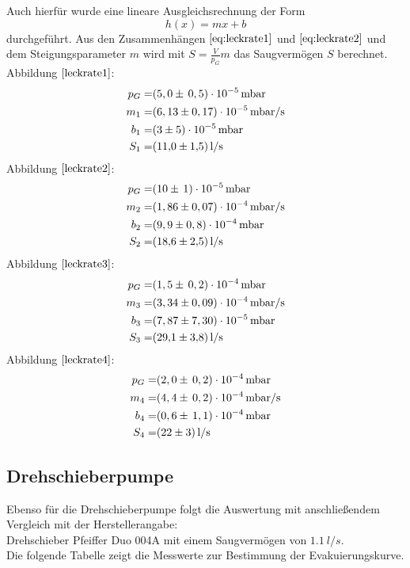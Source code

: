Auch hierfür wurde eine lineare Ausgleichsrechnung der Form
\begin{equation}
	h(x)=mx+b
\end{equation}
durchgeführt.
Aus den Zusammenhängen $\ref{eq:leckrate1}$ und $\ref{eq:leckrate2}$ und dem Steigungsparameter $m$ wird mit $S=\frac{V}{p_G}m$
das Saugvermögen $S$ berechnet.\\

Abbildung $\ref{leckrate1}$:
	\begin{align*}
		p_G=& (5,0 \pm \, 0,5)\cdot 10^{-5} \, \si{mbar}\\
		m_1=& (6,13 \pm 0,17)\cdot 10^{-5} \, \si{mbar/s}\\
		b_1=& (3 \pm 5)\cdot 10^{-5} \, \si{mbar}\\
		S_1=& \SI{11,0 \pm 1,5}{l/s}
	\end{align*}
	Abbildung $\ref{leckrate2}$:
		\begin{align*}
			p_G=& (10 \pm \, 1)\cdot 10^{-5} \, \si{mbar}\\
			m_2=& (1,86 \pm 0,07)\cdot 10^{-4} \, \si{mbar/s}\\
			b_2=& (9,9 \pm 0,8)\cdot 10^{-4} \, \si{mbar}\\
			S_2=& \SI{18,6 \pm 2,5}{l/s}
		\end{align*}
		Abbildung $\ref{leckrate3}$:
			\begin{align*}
				p_G=& (1,5 \pm \, 0,2)\cdot 10^{-4} \, \si{mbar}\\
				m_3=& (3,34 \pm 0,09)\cdot 10^{-4} \, \si{mbar/s}\\
				b_3=& (7,87 \pm 7,30)\cdot 10^{-5} \, \si{mbar}\\
				S_3=& \SI{29,1 \pm 3,8}{l/s}
			\end{align*}
		Abbildung $\ref{leckrate4}$:
			\begin{align*}
				p_G=& (2,0 \pm \, 0,2)\cdot 10^{-4} \, \si{mbar}\\
				m_4=& (4,4 \pm \, 0,2)\cdot 10^{-4} \, \si{mbar/s}\\
				b_4=& (0,6 \pm \, 1,1)\cdot 10^{-4} \, \si{mbar}\\
				S_4=& \SI{22 \pm 3}{l/s}
			\end{align*}

\subsection{Drehschieberpumpe}
Ebenso für die Drehschieberpumpe folgt die Auswertung mit anschließendem Vergleich mit der
Herstellerangabe\cite{anleitung}:\\
Drehschieber Pfeiffer Duo 004A mit einem Saugvermögen von $\SI{1,1}{l/s}$.\\
Die folgende Tabelle zeigt die Messwerte zur Bestimmung der Evakuierungskurve.
